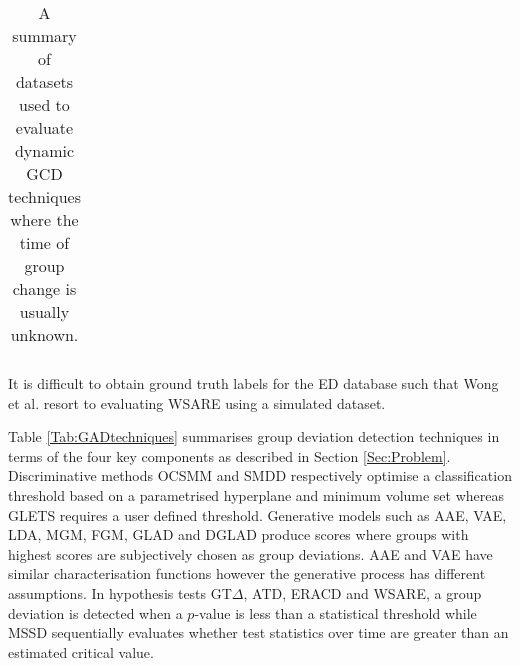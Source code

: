 {\begin{table}[H]
{\begin{center}
{\begin{tabularx}{\linewidth}{p{3.5cm}p{10cm}p{2cm}p{2cm} }
	\end{tabularx}
	}
	\end{center}
    \vspace{-4mm}
 \raggedright {\footnotemark[6]} 
It is difficult to obtain ground truth labels for the ED database such that  Wong et al. \cite{WSARE} resort to evaluating WSARE using a simulated dataset.
	\caption{  A summary of  datasets used to evaluate dynamic GCD techniques where the time of group change is usually unknown. }
 \label{Tab:GCD_Summary}
 }
\end{table}
}


 
 
 
 
 Table \ref{Tab:GADtechniques} summarises group deviation detection techniques in terms of the four key components as  described in Section \ref{Sec:Problem}. Discriminative methods OCSMM and SMDD respectively  optimise a classification threshold based on a parametrised hyperplane and minimum volume set  whereas GLETS requires a user defined threshold.   Generative models such as  AAE, VAE, LDA, MGM, FGM, GLAD and DGLAD produce scores where groups with  highest scores are subjectively chosen as group deviations. AAE and VAE have similar characterisation functions however the generative process has different assumptions.    In hypothesis tests GT$\Delta$, ATD, ERACD and WSARE, a group deviation is detected when a $p$-value is less than a statistical threshold  while MSSD  sequentially evaluates  whether test statistics over time  are greater than an estimated critical value.  
 
 
 
